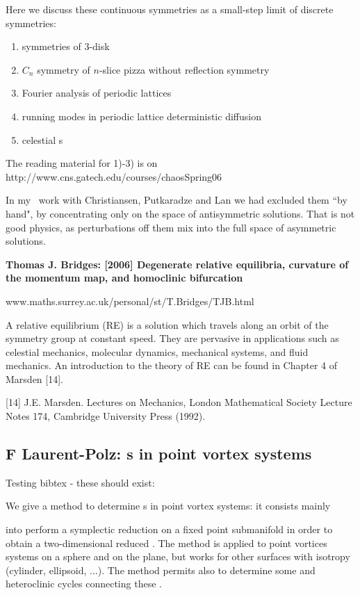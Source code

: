         Here we discuss these continuous symmetries as
a small-step limit of discrete symmetries:

\begin{enumerate}
\item
        symmetries of 3-disk
\item
        $C_n$ symmetry of $n$-slice pizza without reflection symmetry
\item
        Fourier analysis of periodic lattices
\item
        running modes in periodic lattice deterministic
           diffusion
\item
    celestial {\rpo s}
\end{enumerate}

The reading material for 1)-3) is on
http://www.cns.gatech.edu/courses/chaosSpring06

In my \KS\ work with Christiansen, Putkaradze and Lan we
had excluded them ``by hand", by concentrating only on the space of
antisymmetric solutions. That is not good physics, as perturbations off
them mix into the full space of asymmetric solutions.

{\bf Thomas J. Bridges: [2006]  Degenerate relative equilibria,
           curvature of the momentum map, and homoclinic bifurcation}

www.maths.surrey.ac.uk/personal/st/T.Bridges/TJB.html

A relative equilibrium (RE) is a solution which travels along an orbit of the symmetry group
at constant speed. They are pervasive in applications such as celestial mechanics, molecular
dynamics, mechanical systems, and fluid mechanics. An introduction to the theory of RE can
be found in Chapter 4 of Marsden [14].

[14] J.E. Marsden. Lectures on Mechanics, London Mathematical Society Lecture Notes 174,
Cambridge University Press (1992).




\subsection{F Laurent-Polz: {\Rpo s} in point vortex systems}

Testing bibtex - these should exist:

We give a method to determine {\rpo s} in point vortex systems: it consists mainly

into perform a symplectic reduction on a fixed point submanifold in order to obtain
a two-dimensional reduced \statesp. The method is applied to point vortices systems
on a sphere and on the plane, but works for other surfaces with isotropy
(cylinder, ellipsoid, ...). The method permits also to determine some
{\reqva} and heteroclinic cycles connecting these {\reqva}.

